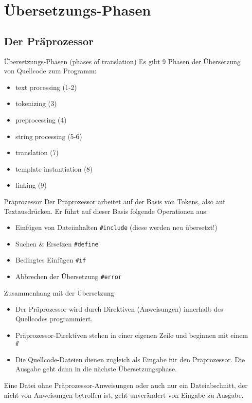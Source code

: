 \section{Übersetzungs-Phasen}


\subsection{Der Präprozessor}

\begin{frame}{Übersetzungs-Phasen (phases of translation)}
	Es gibt 9 Phasen der Übersetzung von Quellcode zum Programm:
	
	\begin{itemize}
		\item text processing (1-2)
		\item tokenizing (3)
		\item preprocessing (4)
		\item string processing (5-6)
		\item translation (7)
		\item template instantiation (8)
		\item linking (9)
	\end{itemize}
\end{frame}

\begin{frame}[fragile]{Präprozessor}
	Der Präprozessor arbeitet auf der Basis von Tokens, also auf Textausdrücken. Er führt auf dieser Basis folgende Operationen aus:
	
	\begin{itemize}
		\item Einfügen von Dateiinhalten \verb|#include| (diese werden neu übersetzt!)
		\item Suchen \& Ersetzen \verb|#define|
		\item Bedingtes Einfügen \verb|#if|
		\item Abbrechen der Übersetzung \verb|#error|
	\end{itemize}
\end{frame}

\begin{frame}[fragile]{Zusammenhang mit der Übersetzung}
	\begin{itemize}
		\item Der Präprozessor wird durch Direktiven (Anweisungen) innerhalb des Quellcodes programmiert.
		\item Präprozessor-Direktiven stehen in einer eigenen Zeile und beginnen mit einem \verb|#|
		\item Die Quellcode-Dateien dienen zugleich als Eingabe für den Präprozessor. Die Ausgabe geht dann in die nächste Übersetzungsphase.
	\end{itemize}
	
	\pause
	
	Eine Datei ohne Präprozessor-Anweisungen oder auch nur ein Dateiabschnitt, der nicht von Anweisungen betroffen ist, geht unverändert von Eingabe zu Ausgabe.
\end{frame}

